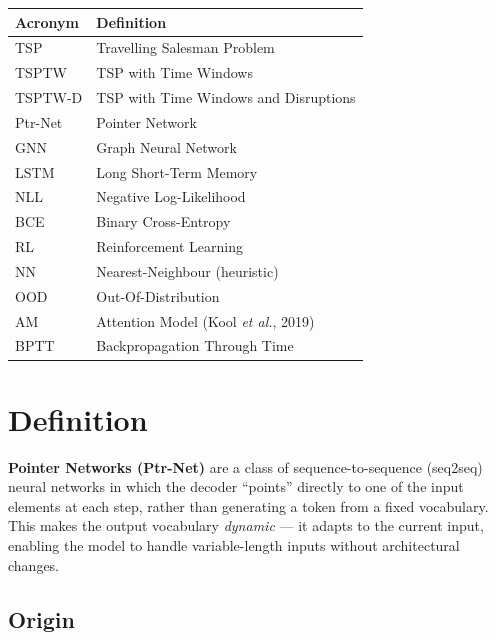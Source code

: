 \documentclass[12pt,a4paper]{article}
\begin{document}
\begin{tabularx}{\linewidth}{lX}
\toprule
\textbf{Acronym} & \textbf{Definition} \\
\midrule
TSP     & Travelling Salesman Problem \\
TSPTW   & TSP with Time Windows \\
TSPTW-D & TSP with Time Windows and Disruptions \\
Ptr-Net & Pointer Network \\
GNN     & Graph Neural Network \\
LSTM    & Long Short-Term Memory \\
NLL     & Negative Log-Likelihood \\
BCE     & Binary Cross-Entropy \\
RL      & Reinforcement Learning \\
NN      & Nearest-Neighbour (heuristic) \\
OOD     & Out-Of-Distribution \\
AM      & Attention Model (Kool \textit{et al.}, 2019) \\
BPTT    & Backpropagation Through Time \\
\bottomrule
\end{tabularx}
\newpage

\section{Definition}

\textbf{Pointer Networks (Ptr-Net)} are a class of sequence-to-sequence
(seq2seq) neural networks in which the decoder ``points'' directly to one of
the input elements at each step, rather than generating a token from a fixed
vocabulary.
This makes the output vocabulary \emph{dynamic} --- it adapts to the current
input, enabling the model to handle variable-length inputs without
architectural changes.

\subsection*{Origin}
\end{document}

